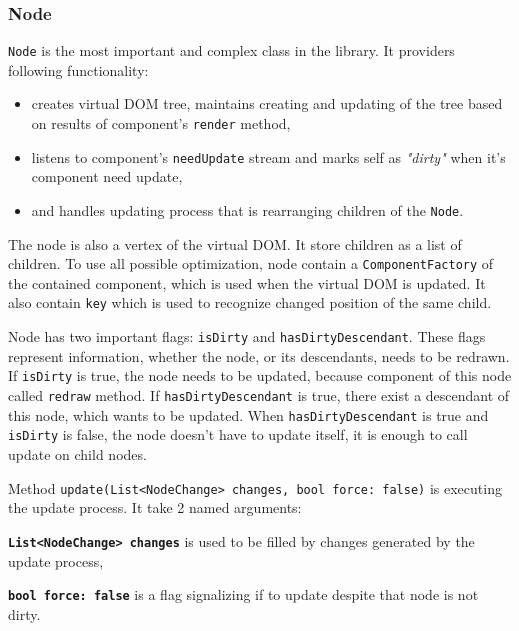 \documentclass[oneside, 12pt]{book}
\begin{document}
    \subsubsection{Node}\label{subsubsec:our-architecture-core-node}
      \texttt{Node} is the most important and complex class in the library.
      It providers following functionality:
      \begin{itemize}
        \item creates virtual DOM tree, maintains creating and updating of the tree based on results of component's \texttt{render} method, 
        \item listens to component's \texttt{needUpdate} stream and marks self as \textit{"dirty"} when it's component need update,
        \item and handles updating process that is rearranging children of the \texttt{Node}.
      \end{itemize}

      The node is also a vertex of the virtual DOM. 
      It store children as a list of children. 
      To use all possible optimization, node contain a \texttt{ComponentFactory} of the contained component, which is used when the virtual DOM is updated.
      It also contain \texttt{key} which is used to recognize changed position of the same child.

      Node has two important flags: \texttt{isDirty} and \texttt{hasDirtyDescendant}. 
      These flags represent information, whether the node, or its descendants, needs to be redrawn.
      If \texttt{isDirty} is true, the node needs to be updated, 
      because component of this node called \texttt{redraw} method.
      If \texttt{hasDirtyDescendant} is true,  
      there exist a descendant of this node, which wants to be updated.
      When \texttt{hasDirtyDescendant} is true and \texttt{isDirty} is false, 
      the node doesn't have to update itself, it is enough to call update on child nodes.

      Method \texttt{update({List<NodeChange> changes, bool force: false})} is executing the update process. 
      It take 2 named arguments:
      \begin{description}
        \item{\textbf{\texttt{List<NodeChange> changes}}} is used to be filled by changes generated by the update process,
        \item{\textbf{\texttt{bool force: false}}} is a flag signalizing if to update despite that node is not dirty.
      \end{description}
\end{document}
